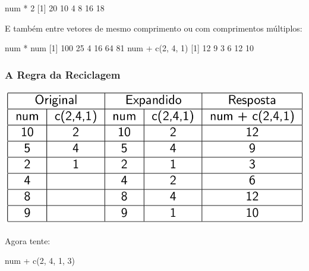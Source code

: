\documentclass[
  10pt,
  a4paper]{book}
\newenvironment{Shaded}{\begin{snugshade}}{\end{snugshade}}
\newcommand{\DecValTok}[1]{\textcolor[rgb]{0.00,0.00,0.81}{#1}}
\newcommand{\FunctionTok}[1]{\textcolor[rgb]{0.00,0.00,0.00}{#1}}
\newcommand{\NormalTok}[1]{#1}
\newcommand{\SpecialCharTok}[1]{\textcolor[rgb]{0.00,0.00,0.00}{#1}}
\begin{document}
\begin{Shaded}
\begin{Highlighting}[]
\NormalTok{num }\SpecialCharTok{*} \DecValTok{2}
\NormalTok{[}\DecValTok{1}\NormalTok{] }\DecValTok{20} \DecValTok{10}  \DecValTok{4}  \DecValTok{8} \DecValTok{16} \DecValTok{18}
\end{Highlighting}
\end{Shaded}

E também entre vetores de mesmo comprimento ou com comprimentos
múltiplos:

\begin{Shaded}
\begin{Highlighting}[]
\NormalTok{num }\SpecialCharTok{*}\NormalTok{ num}
\NormalTok{[}\DecValTok{1}\NormalTok{] }\DecValTok{100}  \DecValTok{25}   \DecValTok{4}  \DecValTok{16}  \DecValTok{64}  \DecValTok{81}
\NormalTok{num }\SpecialCharTok{+} \FunctionTok{c}\NormalTok{(}\DecValTok{2}\NormalTok{, }\DecValTok{4}\NormalTok{, }\DecValTok{1}\NormalTok{)}
\NormalTok{[}\DecValTok{1}\NormalTok{] }\DecValTok{12}  \DecValTok{9}  \DecValTok{3}  \DecValTok{6} \DecValTok{12} \DecValTok{10}
\end{Highlighting}
\end{Shaded}

\hypertarget{a-regra-da-reciclagem}{%
\subsubsection{A Regra da Reciclagem}\label{a-regra-da-reciclagem}}

\begin{center}\includegraphics[width=0.8\linewidth]{img/reciclagem} \end{center}

Agora tente:

\begin{Shaded}
\begin{Highlighting}[]
\NormalTok{num }\SpecialCharTok{+} \FunctionTok{c}\NormalTok{(}\DecValTok{2}\NormalTok{, }\DecValTok{4}\NormalTok{, }\DecValTok{1}\NormalTok{, }\DecValTok{3}\NormalTok{)}
\end{Highlighting}
\end{Shaded}
\end{document}
